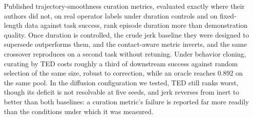 \documentclass[10pt]{article}
\begin{document}
Published trajectory-smoothness curation metrics, evaluated exactly where
their authors did not, on real operator labels under duration controls and
on fixed-length data against task success, rank episode duration more than
demonstration quality. Once duration is controlled, the crude jerk baseline
they were designed to supersede outperforms them, and the contact-aware
metric inverts, and the same crossover reproduces on a second task without
retuning. Under behavior cloning, curating by TED costs roughly a third of
downstream success against random selection of the same size, robust to
correction, while an oracle reaches 0.892 on the same pool. In the
diffusion configuration we tested, TED still ranks worst, though its deficit is not
resolvable at five seeds, and jerk reverses from inert to better than both
baselines: a curation metric's failure is reported far more readily than
the conditions under which it was measured.
\end{document}
